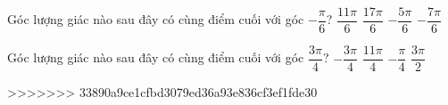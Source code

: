 \begin{ex}%
	Góc lượng giác nào sau đây có cùng điểm cuối với góc $-\dfrac{\pi}{6}$?
	\choice
	{\True $\dfrac{11\pi}{6}$}
	{$\dfrac{17\pi}{6}$}
	{$-\dfrac{5\pi}{6}$}
	{$-\dfrac{7\pi}{6}$}
\end{ex}
\begin{ex}%
	Góc lượng giác nào sau đây có cùng điểm cuối với góc $\dfrac{3\pi}{4}$?
	\choice
	{$-\dfrac{3\pi}{4}$}
	{\True $\dfrac{11\pi}{4}$}
	{$-\dfrac{\pi}{4}$}
	{$\dfrac{3\pi}{2}$}
\end{ex}
>>>>>>> 33890a9ce1cfbd3079ed36a93e836cf3ef1fde30
